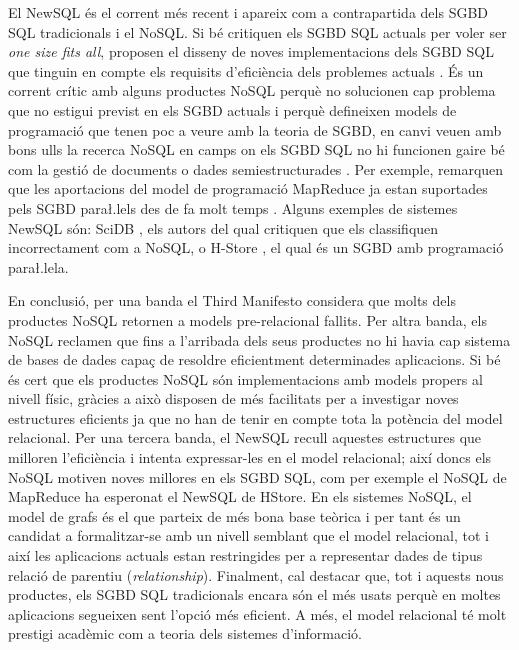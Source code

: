 El NewSQL és el corrent més recent i apareix com a contrapartida dels
\gls{SGBD} \gls{SQL} tradicionals i el NoSQL. Si bé critiquen els \gls{SGBD} \gls{SQL} actuals
per voler ser \emph{one size fits all}, proposen el disseny de noves
implementacions dels \gls{SGBD} \gls{SQL} que tinguin en compte els requisits
d'eficiència dels problemes
actuals \parencite{stonebraker07,stonebraker10}.  És un corrent crític
amb alguns productes NoSQL perquè no solucionen cap problema que no
estigui previst en els \gls{SGBD} actuals i perquè defineixen models de
programació que tenen poc a veure amb la teoria de \gls{SGBD}, en canvi
veuen amb bons ulls la recerca NoSQL en camps on els \gls{SGBD} \gls{SQL} no hi
funcionen gaire bé com la gestió de documents o dades
semiestructurades \parencite{stonebraker11:nocoug}.  Per exemple,
remarquen que les aportacions del model de programació MapReduce ja
estan suportades pels \gls{SGBD} para\l.lels des de fa molt
temps \parencite{pavlo09:sigmod}.  Alguns exemples de sistemes NewSQL
són: SciDB \parencite{stonebraker09:scidb}, els autors del qual
critiquen que els classifiquen incorrectament com a NoSQL, o
H-Store \parencite{hstore}, el qual és un \gls{SGBD} amb programació
para\l.lela.



En conclusió, per una banda el Third Manifesto considera que molts
dels productes NoSQL retornen a models pre-relacional fallits. Per
altra banda, els NoSQL reclamen que fins a l'arribada dels seus
productes no hi havia cap sistema de bases de dades capaç de resoldre
eficientment determinades aplicacions. Si bé és cert que els productes
NoSQL són implementacions amb models propers al nivell físic, gràcies
a això disposen de més facilitats per a investigar noves estructures
eficients ja que no han de tenir en compte tota la potència del model
relacional. Per una tercera banda, el NewSQL recull aquestes
estructures que milloren l'eficiència i intenta expressar-les en el
model relacional; així doncs els NoSQL motiven noves millores en els
\gls{SGBD} \gls{SQL}, com per exemple el NoSQL de MapReduce ha esperonat el NewSQL
de HStore. En els sistemes NoSQL, el model de grafs és el que parteix
de més bona base teòrica i per tant és un candidat a formalitzar-se
amb un nivell semblant que el model relacional, tot i així les
aplicacions actuals estan restringides per a representar dades de
tipus relació de parentiu (\emph{relationship}).  
Finalment, cal destacar que, tot i aquests nous productes, els \gls{SGBD}
\gls{SQL} tradicionals encara són el més usats perquè en moltes aplicacions
segueixen sent l'opció més eficient.  A més, el model relacional té
molt prestigi acadèmic com a teoria dels sistemes d'informació.



